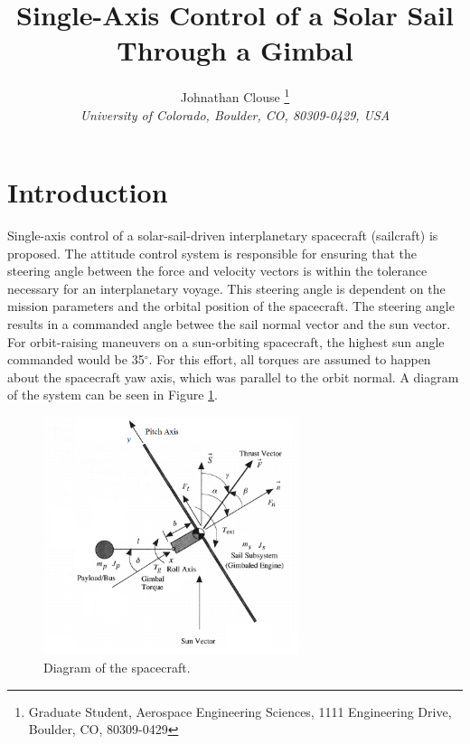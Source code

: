 \documentclass[]{aiaa-tc}%
\title{Single-Axis Control of a Solar Sail Through a Gimbal}
\author{
	Johnathan Clouse%
	\thanks{Graduate Student, Aerospace Engineering Sciences, 1111 Engineering Drive, Boulder, CO, 80309-0429}\\
	{\normalsize\itshape
		University of Colorado, Boulder, CO, 80309-0429, USA}
}
\begin{document}
	

	
	\maketitle
	
	\begin{abstract}
		\noindent 
		
	\end{abstract}
	
	\newpage
	
	\tableofcontents
	
	\newpage

	\section{Introduction}
Single-axis control of a solar-sail-driven interplanetary spacecraft (sailcraft) is proposed.  The attitude control system is responsible for ensuring that the steering angle between the force and velocity vectors is within the tolerance necessary for an interplanetary voyage.  This steering angle is dependent on the mission parameters and the orbital position of the spacecraft. The steering angle results in a commanded angle betwee the sail normal vector and the sun vector. For orbit-raising maneuvers on a sun-orbiting spacecraft, the highest sun angle commanded would be 35$^{\circ}$\cite{McInnes}. For this effort, all torques are assumed to happen about the spacecraft yaw axis, which was parallel to the orbit normal. A diagram of the system can be seen in Figure \ref{fig:Diagram}.
	
	\begin{figure}[H]
		\centering
			\includegraphics[width = 7.5cm]{schematic.png}
		\caption{Diagram of the spacecraft\cite{WieSolarSail2}. }
		\label{fig:Diagram}
	\end{figure}	
	
\end{document}
